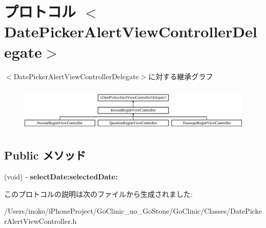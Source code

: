 \hypertarget{protocol_date_picker_alert_view_controller_delegate-p}{
\section{プロトコル $<$DatePickerAlertViewControllerDelegate$>$}
\label{protocol_date_picker_alert_view_controller_delegate-p}
}
$<$DatePickerAlertViewControllerDelegate$>$に対する継承グラフ\begin{figure}[H]
\begin{center}
\leavevmode
\includegraphics[height=2.178988cm]{protocol_date_picker_alert_view_controller_delegate-p}
\end{center}
\end{figure}
\subsection*{Public メソッド}
\begin{DoxyCompactItemize}
\item 
\hypertarget{protocol_date_picker_alert_view_controller_delegate-p_abbcecbfdd64a6d51603747a82699981f}{
(void) -\/ {\bfseries selectDate:selectedDate:}}
\label{protocol_date_picker_alert_view_controller_delegate-p_abbcecbfdd64a6d51603747a82699981f}

\end{DoxyCompactItemize}


このプロトコルの説明は次のファイルから生成されました:\begin{DoxyCompactItemize}
\item 
/Users/inoko/iPhoneProject/GoClinic\_\-no\_\-GoStone/GoClinic/Classes/DatePickerAlertViewController.h\end{DoxyCompactItemize}
